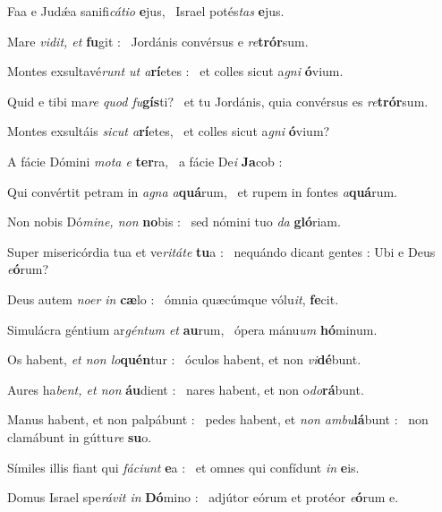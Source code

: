 \documentclass[12pt]{article} %
\newenvironment{psalmtext}{\leftskip 0.25in}{\vspace{2 mm}}
\let\oldgresixstar\gresixstar
\renewcommand{\gresixstar}{\textcolor{benred8}{\oldgresixstar}}
\let\oldgredagger\gredagger
\renewcommand{\gredagger}{\textcolor{benred8}{\oldgredagger}}
\begin{document}
\begin{psalmtext}
Faa e Judǽa sanifi\emph{cátio} \textbf{e}jus, \gresixstar\ Israel potés\emph{tas} \textbf{e}jus.

Mare \emph{vidit, et} \textbf{fu}git : \gresixstar\ Jordánis convérsus e \emph{re}\textbf{trór}sum.

Montes exsultavé\emph{runt ut a}\textbf{rí}etes : \gresixstar\ et colles sicut a\emph{gni} \textbf{ó}vium.

Quid e tibi ma\emph{re quod fu}\textbf{gís}ti? \gresixstar\ et tu Jordánis, quia convérsus es \emph{re}\textbf{trór}sum.

Montes exsultáis \emph{sicut a}\textbf{rí}etes, \gresixstar\ et colles sicut a\emph{gni} \textbf{ó}vium?

A fácie Dómini \emph{mota e} \textbf{ter}ra, \gresixstar\ a fácie De\emph{i} \textbf{Ja}cob : 

Qui convértit petram in \emph{agna a}\textbf{quá}rum, \gresixstar\ et rupem in fontes \emph{a}\textbf{quá}rum.

Non nobis Dó\emph{mine, non} \textbf{no}bis : \gresixstar\ sed nómini tuo \emph{da} \textbf{gló}riam.

Super misericórdia tua et ve\emph{ritáte} \textbf{tu}a : \gresixstar\ nequándo dicant gentes : Ubi e Deus \emph{e}\textbf{ó}rum?

Deus autem \emph{noer in} \textbf{cæ}lo : \gresixstar\ ómnia quæcúmque vólu\emph{it}, \textbf{fe}cit.

Simulácra géntium ar\emph{géntum et} \textbf{au}rum, \gresixstar\ ópera mánu\emph{um} \textbf{hó}minum.

Os habent, \emph{et non lo}\textbf{quén}tur : \gresixstar\ óculos habent, et non \emph{vi}\textbf{dé}bunt.

Aures ha\emph{bent, et non} \textbf{áu}dient : \gresixstar\ nares habent, et non o\emph{do}\textbf{rá}bunt.

Manus habent, et non palpábunt : \gredagger\ pedes habent, et \emph{non ambu}\textbf{lá}bunt : \gresixstar\ non clamábunt in gúttu\emph{re} \textbf{su}o.

Símiles illis fiant qui \emph{fáciunt} \textbf{e}a : \gresixstar\ et omnes qui confídunt \emph{in} \textbf{e}is.

Domus Israel spe\emph{rávit in} \textbf{Dó}mino : \gresixstar\ adjútor eórum et protéor \emph{e}\textbf{ó}rum e.


\end{psalmtext}
\end{document}
